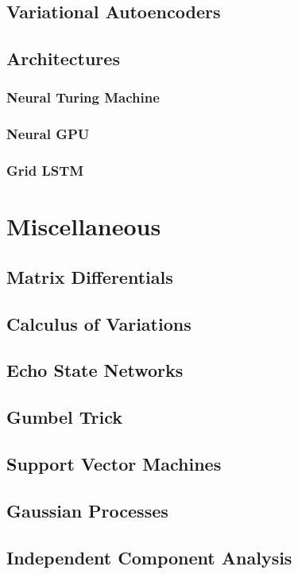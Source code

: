 \documentclass[12pt]{article}
\begin{document}
\subsection{Variational Autoencoders}

\subsection{Architectures}

\subsubsection{Neural Turing Machine}

\subsubsection{Neural GPU}

\subsubsection{Grid LSTM}

\section{Miscellaneous}

\subsection{Matrix Differentials}

\subsection{Calculus of Variations}

\subsection{Echo State Networks}

\subsection{Gumbel Trick}

\subsection{Support Vector Machines}

\subsection{Gaussian Processes}

\subsection{Independent Component Analysis}
\end{document}
